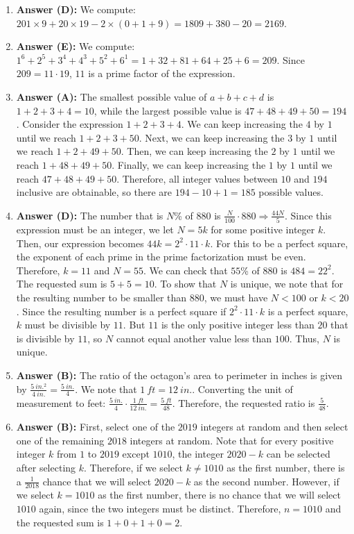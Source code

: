 \documentclass{article}
\begin{document}
\begin{enumerate}
\item \textbf{Answer (D):} We compute: $201\times9+20\times19-2\times(0+1+9)=1809+380-20=2169$.

\item \textbf{Answer (E):} We compute: $1^{6}+2^{5}+3^{4}+4^{3}+5^{2}+6^{1}=1+32+81+64+25+6=209$. Since $209=11\cdot19$, $11$ is a prime factor of the expression.

\item \textbf{Answer (A):} The smallest possible value of $a+b+c+d$ is $1+2+3+4=10$, while the largest possible value is $47+48+49+50=194$. Consider the expression $1+2+3+4$. We can keep increasing the $4$ by $1$ until we reach $1+2+3+50$. Next, we can keep increasing the $3$ by $1$ until we reach $1+2+49+50$. Then, we can keep increasing the $2$ by $1$ until we reach $1+48+49+50$. Finally, we can keep increasing the $1$ by $1$ until we reach $47+48+49+50$. Therefore, all integer values between $10$ and $194$ inclusive are obtainable, so there are $194-10+1=185$ possible values.

\item \textbf{Answer (D):} The number that is $N$\% of $880$ is $\frac{N}{100}\cdot880\Rightarrow\frac{44N}{5}$. Since this expression must be an integer, we let $N=5k$ for some positive integer $k$. Then, our expression becomes $44k=2^{2}\cdot11\cdot k$. For this to be a perfect square, the exponent of each prime in the prime factorization must be even. Therefore, $k=11$ and $N=55$. We can check that $55$\% of $880$ is $484=22^{2}$. The requested sum is $5+5=10$. To show that $N$ is unique, we note that for the resulting number to be smaller than $880$, we must have $N<100$ or $k<20$. Since the resulting number is a perfect square if $2^{2}\cdot11\cdot k$ is a perfect square, $k$ must be divisible by $11$. But $11$ is the only positive integer less than $20$ that is divisible by $11$, so $N$ cannot equal another value less than $100$. Thus, $N$ is unique.

\item \textbf{Answer (B):} The ratio of the octagon's area to perimeter in inches is given by $\frac{5~in.^{2}}{4~in.}=\frac{5~in.}{4}$. We note that $1~ft=12~in.$. Converting the unit of measurement to feet: $\frac{5~in.}{4}\cdot\frac{1~ft}{12~in.}=\frac{5~ft}{48}$. Therefore, the requested ratio is $\frac{5}{48}$.

\item \textbf{Answer (B):} First, select one of the $2019$ integers at random and then select one of the remaining $2018$ integers at random. Note that for every positive integer $k$ from $1$ to $2019$ except $1010$, the integer $2020-k$ can be selected after selecting $k$. Therefore, if we select $k\ne1010$ as the first number, there is a $\frac{1}{2018}$ chance that we will select $2020-k$ as the second number. However, if we select $k=1010$ as the first number, there is no chance that we will select $1010$ again, since the two integers must be distinct. Therefore, $n=1010$ and the requested sum is $1+0+1+0=2$.


\end{enumerate}
\end{document}
